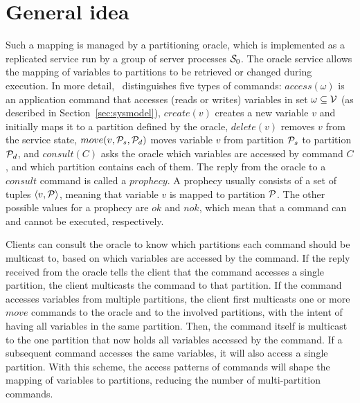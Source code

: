 \section{General idea}
\label{sec:dssmr-idea}

 Such
a mapping is managed by a partitioning oracle, which is implemented as a
replicated service run by a group of server processes $\mathcal{S}_0$. The oracle
service allows the mapping of variables to partitions to be retrieved or changed
during execution. In more detail, \dssmr\ distinguishes five types of commands:
$access(\omega)$ is an application command that accesses (reads or writes)
variables in set $\omega \subseteq \mathcal{V}$ (as described in
Section~\ref{sec:sysmodel}), $create(v)$ creates a new variable $v$ and
initially maps it to a partition defined by the oracle, $delete(v)$ removes $v$
from the service state, $move(v,\mathcal{P}_s,\mathcal{P}_d)$ moves variable $v$ from
partition $\mathcal{P}_s$ to partition $\mathcal{P}_d$, and $consult(C)$ asks the oracle which
variables are accessed by command $C$, and which partition contains each of
them. The reply from the oracle to a $consult$ command is called a $prophecy$. A
prophecy usually consists of a set of tuples $\langle v, \mathcal{P} \rangle$, meaning
that variable $v$ is mapped to partition $\mathcal{P}$. The other possible values for a
prophecy are $ok$ and $nok$, which mean that a command can and cannot be
executed, respectively.

Clients can consult the oracle to know which partitions each command should be
multicast to, based on which variables are accessed by the command. If the reply
received from the oracle tells the client that the command accesses a single
partition, the client multicasts the command to that partition. If the command
accesses variables from multiple partitions, the client first multicasts one or
more $move$ commands to the oracle and to the involved partitions, with the
intent of having all variables in the same partition. Then, the command itself
is multicast to the one partition that now holds all variables accessed by the
command. If a subsequent command accesses the same variables, it will also
access a single partition. With this scheme, the access patterns of commands
will shape the mapping of variables to partitions, reducing the number of
multi-partition commands.

